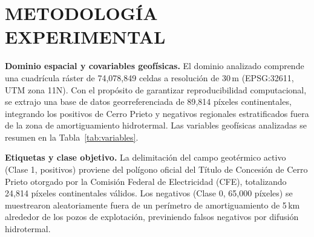 \documentclass[10pt,twocolumn,letterpaper]{article}
\begin{document}
\section{METODOLOGÍA EXPERIMENTAL}

\textbf{Dominio espacial y covariables geofísicas.} El dominio analizado comprende una cuadrícula ráster de 74{,}078{,}849 celdas a resolución de 30\,m (EPSG:32611, UTM zona 11N). Con el propósito de garantizar reproducibilidad computacional, se extrajo una base de datos georreferenciada de 89{,}814 píxeles continentales, integrando los positivos de Cerro Prieto y negativos regionales estratificados fuera de la zona de amortiguamiento hidrotermal. Las variables geofísicas analizadas se resumen en la Tabla~\ref{tab:variables}.

\begin{table}[htbp]
\centering
\caption{Covariables geofísicas del modelo de susceptibilidad.}
\label{tab:variables}
\end{table}

\textbf{Etiquetas y clase objetivo.} La delimitación del campo geotérmico activo (Clase 1, positivos) proviene del polígono oficial del Título de Concesión de Cerro Prieto otorgado por la Comisión Federal de Electricidad (CFE), totalizando 24{,}814 píxeles continentales válidos. Los negativos (Clase 0, 65{,}000 píxeles) se muestrearon aleatoriamente fuera de un perímetro de amortiguamiento de 5\,km alrededor de los pozos de explotación, previniendo falsos negativos por difusión hidrotermal.
\end{document}
